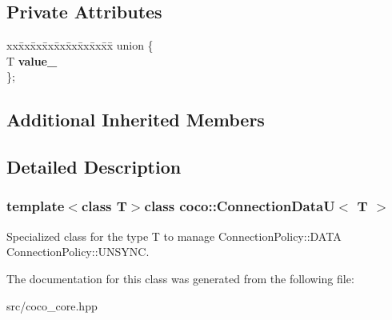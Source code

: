 \subsection*{Private Attributes}
\begin{DoxyCompactItemize}
\item 
\hypertarget{classcoco_1_1_connection_data_u_a92f0caeeb4dfc2b9b9932a3a45d26f5a}{}\begin{tabbing}
xx\=xx\=xx\=xx\=xx\=xx\=xx\=xx\=xx\=\kill
union \{\\
\>T {\bfseries value\_}\\
\}; \label{classcoco_1_1_connection_data_u_a92f0caeeb4dfc2b9b9932a3a45d26f5a}
\\

\end{tabbing}\end{DoxyCompactItemize}
\subsection*{Additional Inherited Members}


\subsection{Detailed Description}
\subsubsection*{template$<$class T$>$class coco\+::\+Connection\+Data\+U$<$ T $>$}

Specialized class for the type T to manage Connection\+Policy\+::\+D\+A\+T\+A Connection\+Policy\+::\+U\+N\+S\+Y\+N\+C. 

The documentation for this class was generated from the following file\+:\begin{DoxyCompactItemize}
\item 
src/coco\+\_\+core.\+hpp\end{DoxyCompactItemize}
